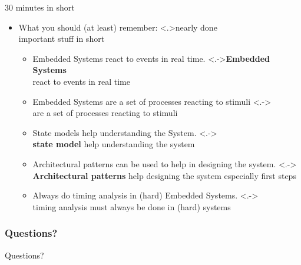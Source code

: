 \documentclass[ngerman={babel}, utf8, bigger, t, xcolor={table,dvipsnames}, ompress, hyperref={bookmarks,colorlinks},red]{beamer}
\begin{document}
\begin{frame}{30 minutes in short}
	\begin{itemize}
		\item What you should (at least) remember:
		\note<.>{nearly done \\ important stuff in short}
		\begin{itemize}
			\item Embedded Systems react to events in real time.
			\note<.->{\textbf{Embedded Systems} \\ react to events in real time}
			\item Embedded Systems are a set of processes reacting to stimuli
			\note<.->{\\ are a set of processes reacting to stimuli}
			\item State models help understanding the System.
			\note<.->{\\ \textbf{state model} help understanding the system}
			\item Architectural patterns can be used to help in designing the system.
			\note<.->{ \\\textbf{Architectural patterns} help designing the system {\tiny especially first steps}}
			\item Always do timing analysis in (hard) Embedded Systems.
			\note<.->{\\timing analysis must always be done in (hard) systems}
		\end{itemize}
	\end{itemize}
\end{frame}

\begin{frame}[c]
\frametitle{Questions?}
	\centerline{\Huge Questions?}
\end{frame}
\end{document}
